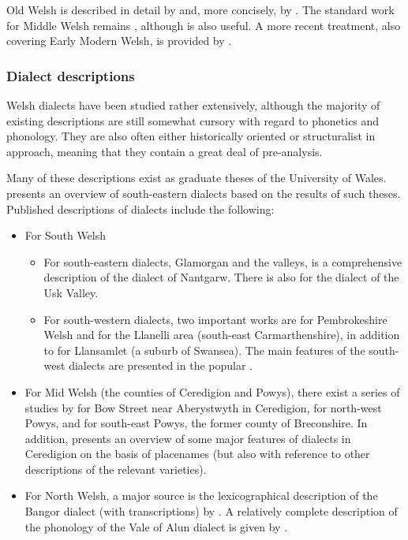 Old Welsh is described in detail by \citet{falileyev07:_le} and, more concisely, by \citet{schrijver11:_middl_early_moder_breton}. The standard work for Middle Welsh remains \citet{simonevans}, although \citet{wg-mj} is also useful. A more recent treatment, also covering Early Modern Welsh, is provided by \citet{schumacher11:_mittel_fruhn}.

\subsubsection{Dialect descriptions}
\label{sec:dialects-2}

Welsh dialects have been studied rather extensively, although the majority of existing descriptions are still somewhat cursory with regard to phonetics and phonology. They are also often either historically oriented or structuralist in approach, meaning that they contain a great deal of pre\hyp analysis.

Many of these descriptions exist as graduate theses of the University of Wales. \citet{thomas-sewales} presents an overview of south\hyp eastern dialects based on the results of such theses. Published descriptions of dialects include the following:

\begin{itemize}
\item For South Welsh
  \begin{itemize}
  \item For south-eastern dialects, \ie Glamorgan and the valleys, \citet{thomas64:_rhai_nantg,thomas93:_tafod_nantg} is a comprehensive description of the dialect of Nantgarw. There is also \citet{thomas60:_ffonem_dyffr_wysg,thomas61:_ffonem_dyffr_wysg} for the dialect of the Usk Valley.
  \item For south-western dialects, two important works are \citet{awbery86:_pembr_welsh} for Pembrokeshire Welsh and \citet{thorne76:_astud_carnw_sir_gaerf} for the Llanelli area (south-east Carmarthenshire), in addition to \citet{llansamlet} for Llansamlet (a suburb of Swansea). The main features of the south\hyp west dialects are presented in the popular \citet{jones92:_dyfed}.
  \end{itemize}
\item For Mid Welsh (\ie the counties of Ceredigion and Powys), there exist a series of studies by \citet{pilch57:_lauts,pilch-nasal,pilch75:_advan_welsh} for Bow Street near Aberystwyth in Ceredigion, \citet{sommerfelt} for north\hyp west Powys, and \citet{brycheiniog} for south-east Powys, \ie the former county of Breconshire. In addition, \citet{wmffre03:_languag_wales} presents an overview of some major features of dialects in Ceredigion on the basis of placenames (but also with reference to other descriptions of the relevant varieties).
\item For North Welsh, a major source is the lexicographical description of the Bangor dialect (with transcriptions) by \citet{fynes-clinton}. A relatively complete description of the phonology of the Vale of Alun dialect is given by \citet{thomas66:_system_welsh}.
\end{itemize}

